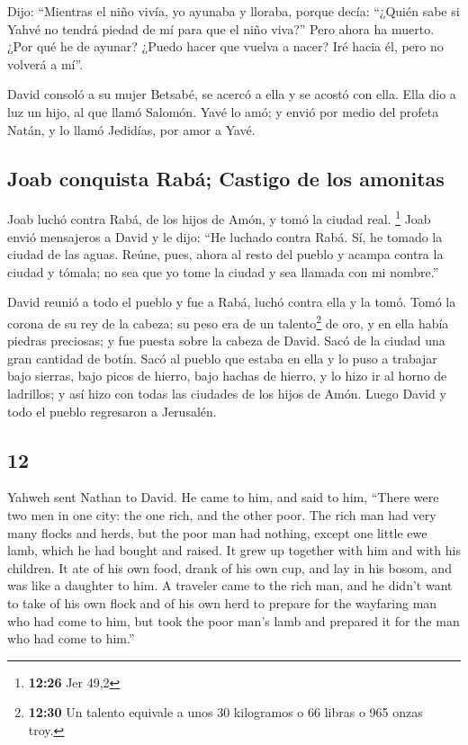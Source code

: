 \begin{paracol}{2}
 Dijo: ``Mientras el niño vivía, yo ayunaba y lloraba,
porque decía: ``¿Quién sabe si Yahvé no tendrá piedad de mí para que el
niño viva?''  Pero ahora ha muerto. ¿Por qué he de
ayunar? ¿Puedo hacer que vuelva a nacer? Iré hacia él, pero no volverá a
mí''.

 David consoló a su mujer Betsabé, se acercó a ella y se
acostó con ella. Ella dio a luz un hijo, al que llamó Salomón. Yavé lo
amó;  y envió por medio del profeta Natán, y lo llamó
Jedidías, por amor a Yavé.

\hypertarget{joab-conquista-rabuxe1-castigo-de-los-amonitas}{%
\subsection{Joab conquista Rabá; Castigo de los
amonitas}\label{joab-conquista-rabuxe1-castigo-de-los-amonitas}}

 Joab luchó contra Rabá, de los hijos de Amón, y tomó la
ciudad real. \footnote{\textbf{12:26} Jer 49,2}  Joab
envió mensajeros a David y le dijo: ``He luchado contra Rabá. Sí, he
tomado la ciudad de las aguas.  Reúne, pues, ahora al
resto del pueblo y acampa contra la ciudad y tómala; no sea que yo tome
la ciudad y sea llamada con mi nombre.''

 David reunió a todo el pueblo y fue a Rabá, luchó contra
ella y la tomó.  Tomó la corona de su rey de la cabeza;
su peso era de un talento\footnote{\textbf{12:30} Un talento equivale a
  unos 30 kilogramos o 66 libras o 965 onzas troy.} de oro, y en ella
había piedras preciosas; y fue puesta sobre la cabeza de David. Sacó de
la ciudad una gran cantidad de botín.  Sacó al pueblo que
estaba en ella y lo puso a trabajar bajo sierras, bajo picos de hierro,
bajo hachas de hierro, y lo hizo ir al horno de ladrillos; y así hizo
con todas las ciudades de los hijos de Amón. Luego David y todo el
pueblo regresaron a Jerusalén.

\switchcolumn
\begin{otherlanguage}{english}

\hypertarget{section-23}{%
\section{12}\label{section-23}}

 Yahweh sent Nathan to David. He came to him, and said to
him, ``There were two men in one city: the one rich, and the other poor.
 The rich man had very many flocks and herds,
 but the poor man had nothing, except one little ewe lamb,
which he had bought and raised. It grew up together with him and with
his children. It ate of his own food, drank of his own cup, and lay in
his bosom, and was like a daughter to him.  A traveler
came to the rich man, and he didn't want to take of his own flock and of
his own herd to prepare for the wayfaring man who had come to him, but
took the poor man's lamb and prepared it for the man who had come to
him.''


\end{otherlanguage}
\end{paracol}

